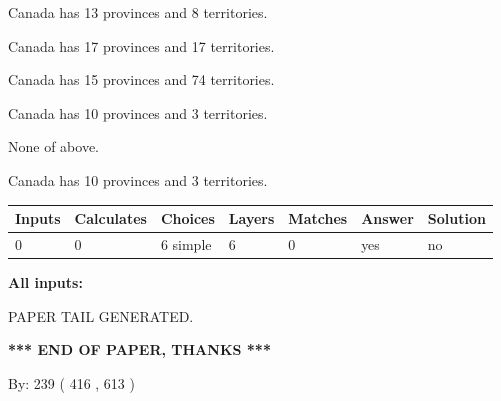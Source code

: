\documentclass[12pt]{article}
\begin{document}
 
Canada has  13 provinces and  8 territories.
 
 
Canada has  17 provinces and  17 territories.
 
 
Canada has  15 provinces and  74 territories.
 
 
Canada has 10  provinces and 3 territories.
 
 
 None of above.
 
 
\noindent{}
 
 
Canada has 10  provinces and 3 territories.
 
 
\noindent{}
 
 
   
   
   
   
\noindent\begin{tabular}{|l|l|l|l|l|l|l|}
 \hline
Inputs & Calculates & Choices & Layers & Matches & Answer & Solution \\ \hline
 0  & 
 0  & 
 6
  simple  
  & 
 6  & 
 0  & 
  yes & 
  no 
  \\ \hline
 \end{tabular}
   
   
   
   
\noindent{}
   
   
   
   
\noindent\vspace{0.1in}\hspace{-0.08in} {\textbf{\Large{All inputs: }}}
   
   
   
   
   
   
 \vspace{0.2in}
 
   
   
\vspace{2.0in} PAPER TAIL GENERATED.
   
   
   
   
\vspace{1.0in} 
{\textbf{\large{ *** END OF PAPER, THANKS *** }}} 
   
   
\hspace{1.0in} By: 
 239 ( 416 ,  613 )
   
\end{document}
